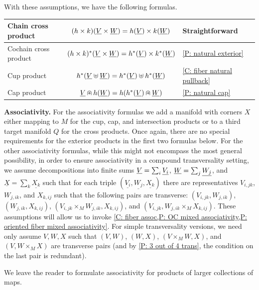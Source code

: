 With these assumptions, we have the following formulas.

\begin{center}
	\begin{tabular}{|l|c|l|}
		\hline
		Chain cross product&$(h \times k)(\underline{V} \times \underline{W}) = h(\underline{V}) \times k(\underline{W})$ &Straightforward\\
		\hline
		Cochain cross product&$(h \times k)^*(\underline{V} \times \underline{W}) = h^*(\underline{V}) \times k^*(\underline{W})$ &\cref{P: natural exterior}\\
		\hline
		Cup product &$h^*(\underline{V}\uplus \underline{W}) = h^*(\underline{V}) \uplus h^*(\underline{W})$&\cref{C: fiber natural pullback}\\
		\hline
		Cap product &$\underline{V} \nplus h(\underline{W}) = h(h^*(\underline{V})\nplus \underline{W})$&\cref{P: natural cap}\\
		\hline
	\end{tabular}
\end{center}

\medskip\noindent\textbf{Associativity.}
For the associativity formulas we add a manifold with corners $X$ either mapping to $M$ for the cup, cap, and intersection products or to a third target manifold $Q$ for the cross products.
Once again, there are no special requirements for the exterior products in the first two formulas below.
For the other associativity formulas, while this might not encompass the most general possibility, in order to ensure associativity in a compound transversality setting, we assume decompositions into finite sums $\underline{V} = \sum_i \underline{V_i}$, $\underline{W} = \sum_j \underline{W_j}$, and $\underline{X} = \sum_k \underline{X_k}$ such that for each triple $(\underline{V_i},\underline{W_j}, \underline{X_k})$ there are representatives $V_{i,jk}$, $W_{j,ik}$, and $X_{k,ij}$ such that the following pairs are transverse: $(V_{i,jk}, W_{j,ik})$, $(W_{j,ik},X_{k,ij})$, $(V_{i,jk} \times_M W_{j,ik},X_{k,ij})$, and $(V_{i,jk}, W_{j,ik} \times_M X_{k,ij})$.
These assumptions will allow us to invoke \cref{C: fiber assoc,P: OC mixed associativity,P: oriented fiber mixed associativity}.
For simple transversality versions, we need only assume $V, W, X$ such that $(V, W)$, $(W,X)$, $(V \times_M W,X)$, and $(V, W \times_M X)$ are transverse pairs (and by \cref{P: 3 out of 4 trans}, the condition on the last pair is redundant).

We leave the reader to formulate associativity for products of larger collections of maps.

